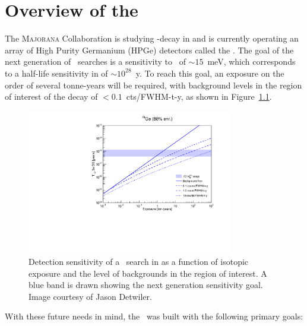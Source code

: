 \documentclass[/main.tex]{subfiles}
\begin{document}
\graphicspath{{./pics/}{ch2/pics/}}

\onlyinsubfile{\textpages}
\chapter{Overview of the \MJD}

The \textsc{Majorana} Collaboration is studying \bb -decay in  and is currently operating an array of High Purity Germanium (HPGe) detectors called the \MJD\cite{mjd2014}.
The goal of the next generation of \znbb\ searches is a sensitivity to \mbb\ of $\sim15$~meV, which corresponds to a half-life sensitivity in  of $\sim10^{28}$~y.
To reach this goal, an exposure on the order of several tonne-years will be required, with background levels in the region of interest of the decay of $<0.1$~cts/FWHM-t-y, as shown in Figure~\ref{fig:sensitivity}.
\begin{figure}[h]
  \centering
  \includegraphics[width=0.8\textwidth]{sensitivityplot}
  \caption[Detection sensitivity to \znbb\ in ]{\label{fig:sensitivity}
    Detection sensitivity of a \znbb\ search in  as a function of isotopic exposure and the level of backgrounds in the region of interest. A blue band is drawn showing the next generation sensitivity goal. Image courtesy of Jason Detwiler.
  }
\end{figure}
With these future needs in mind, the \MJD\ was built with the following primary goals:
\end{document}
